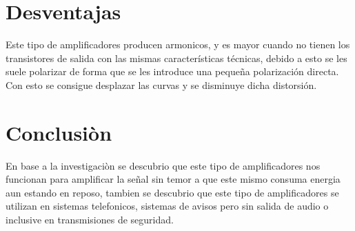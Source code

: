 \documentclass[12pt,a4paper]{article}
\begin{document}
\section{Desventajas}
Este tipo de amplificadores producen armonicos, y es mayor cuando no tienen los transistores de salida con las mismas características técnicas, debido a esto se les suele polarizar de forma que se les introduce una pequeña polarización directa. Con esto se consigue desplazar las curvas y se disminuye dicha distorsión.

\section{Conclusiòn}
En base a la investigaciòn se descubrio que este tipo de amplificadores nos funcionan para amplificar la señal sin temor a que este mismo consuma energia aun estando en reposo, tambien se descubrio que este tipo de amplificadores se utilizan en sistemas telefonicos, sistemas de avisos pero sin salida de audio o inclusive en transmisiones de seguridad.
\end{document}
